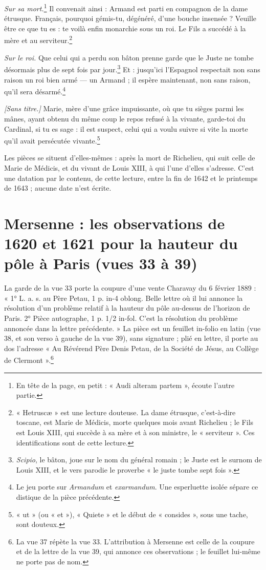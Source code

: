 \documentclass[11pt,a4paper]{article}
\begin{document}
\emph{Sur sa mort.}\footnote{En tête de la page, en petit : « Audi alteram
partem », écoute l'autre partie.} Il convenait ainsi : Armand est parti en
compagnon de la dame étrusque. Français, pourquoi gémis-tu, dégénéré, d'une
bouche insensée ? Veuille être ce que tu es : te voilà enfin monarchie sous
un roi. Le Fils a succédé à la mère et au serviteur.\footnote{« Hetruscæ » est
une lecture douteuse. La dame étrusque, c'est-à-dire toscane, est Marie de
Médicis, morte quelques mois avant Richelieu ; le Fils est Louis XIII, qui
succède à sa mère et à son ministre, le « serviteur ». Ces identifications
sont de cette lecture.}

\emph{Sur le roi.} Que celui qui a perdu son bâton prenne garde que le Juste
ne tombe désormais plus de sept fois par jour.\footnote{\emph{Scipio}, le
bâton, joue sur le nom du général romain ; le Juste est le surnom de
Louis XIII, et le vers parodie le proverbe « le juste tombe sept fois ».}
Et : jusqu'ici l'Espagnol respectait non sans raison un roi bien armé — un
Armand ; il espère maintenant, non sans raison, qu'il sera désarmé.\footnote{Le
jeu porte sur \emph{Armandum} et \emph{exarmandum}. Une esperluette isolée
sépare ce distique de la pièce précédente.}

\emph{[Sans titre.]} Marie, mère d'une grâce impuissante, où que tu sièges
parmi les mânes, ayant obtenu du même coup le repos refusé à la vivante,
garde-toi du Cardinal, si tu es sage : il est suspect, celui qui a voulu
suivre si vite la morte qu'il avait persécutée vivante.\footnote{« ut »
(ou « et »), « Quiete » et le début de « consides », sous une tache, sont
douteux.}

Les pièces se situent d'elles-mêmes : après la mort de Richelieu, qui suit
celle de Marie de Médicis, et du vivant de Louis XIII, à qui l'une d'elles
s'adresse. C'est une datation par le contenu, de cette lecture, entre la fin
de 1642 et le printemps de 1643 ; aucune date n'est écrite.

\section*{Mersenne : les observations de 1620 et 1621 pour la hauteur du pôle à Paris (vues 33 à 39)}

La garde de la vue 33 porte la coupure d'une vente Charavay du 6 février
1889 : « 1° L. a. s. au Père Petau, 1 p. in-4 oblong. Belle lettre où il lui
annonce la résolution d'un problème relatif à la hauteur du pôle au-dessus de
l'horizon de Paris. 2° Pièce autographe, 1 p. 1/2 in-fol. C'est la résolution
du problème annoncée dans la lettre précédente. » La pièce est un feuillet
in-folio en latin (vue 38, et son verso à gauche de la vue 39), sans
signature ; plié en lettre, il porte au dos l'adresse « Au Révérend Père Denis
Petau, de la Société de Jésus, au Collège de Clermont ».\footnote{La vue 37
répète la vue 33. L'attribution à Mersenne est celle de la coupure et de la
lettre de la vue 39, qui annonce ces observations ; le feuillet lui-même ne
porte pas de nom.}
\end{document}
